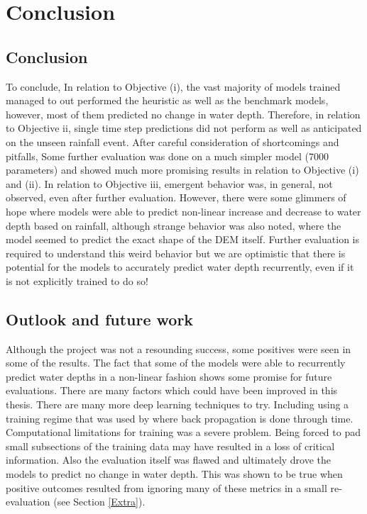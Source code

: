 
\chapter{Conclusion} %
\label{Chapter6} %

\section{Conclusion}
To conclude, In relation to Objective (i), the vast majority of models trained managed to out performed the heuristic as well as the benchmark models, however, most of them predicted no change in water depth. Therefore, in relation to Objective ii, single time step predictions did not perform as well as anticipated on the unseen rainfall event. After careful consideration of shortcomings and pitfalls, Some further evaluation was done on a much simpler model (7000 parameters) and showed much more promising results in relation to Objective (i) and (ii). In relation to Objective iii, emergent behavior was, in general, not observed, even after further evaluation. However, there were some glimmers of hope where models were able to predict non-linear increase and decrease to water depth based on rainfall, although strange behavior was also noted, where the model seemed to predict the exact shape of the DEM itself. Further evaluation is required to understand this weird behavior but we are optimistic that there is potential for the models to accurately predict water depth recurrently, even if it is not explicitly trained to do so!

\section{Outlook and future work}
Although the project was not a resounding success, some positives were seen in some of the results. The fact that some of the models were able to recurrently predict water depths in a non-linear fashion shows some promise for future evaluations. There are many factors which could have been improved in this thesis. There are many more deep learning techniques to try. Including using a training regime that was used by \citeauthor{growing_nca} where back propagation is done through time. Computational limitations for training was a severe problem. Being forced  to pad small subsections of the training data may have resulted in a loss of critical information. Also the evaluation itself  was flawed and ultimately drove the models to predict no change in water depth. This was shown to be true when positive outcomes resulted from ignoring many of these metrics in a small re-evaluation (see Section \ref{Extra}).

